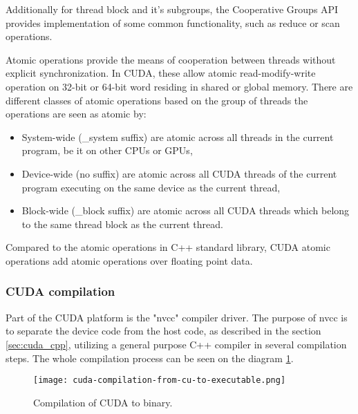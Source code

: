 Additionally for thread block and it's subgroups, the Cooperative Groups API provides implementation of some common functionality, such as reduce or scan operations.



Atomic operations provide the means of cooperation between threads without explicit synchronization. In CUDA, these allow atomic read-modify-write operation on 32-bit or 64-bit word residing in shared or global memory. There are different classes of atomic operations based on the group of threads the operations are seen as atomic by:

\begin{itemize}
	\item System-wide (\_system suffix) are atomic across all threads in the current program, be it on other CPUs or GPUs,
	\item Device-wide (no suffix) are atomic across all CUDA threads of the current program executing on the same device as the current thread,
	\item Block-wide (\_block suffix) are atomic across all CUDA threads which belong to the same thread block as the current thread.
\end{itemize}

Compared to the atomic operations in C++ standard library, CUDA atomic operations add atomic operations over floating point data.





\subsubsection{CUDA compilation}
\label{sec:cuda_compilation}
Part of the CUDA platform is the "nvcc" compiler driver. The purpose of nvcc is to separate the device code from the host code, as described in the section \ref{sec:cuda_cpp}, utilizing a general purpose C++ compiler in several compilation steps. The whole compilation process can be seen on the diagram \ref{fig:cuda_compilation}.


\begin{figure}[h]
	\centering
	\texttt{[image: cuda-compilation-from-cu-to-executable.png]}
	\caption{Compilation of CUDA to binary.}
	\label{fig:cuda_compilation}
\end{figure}


